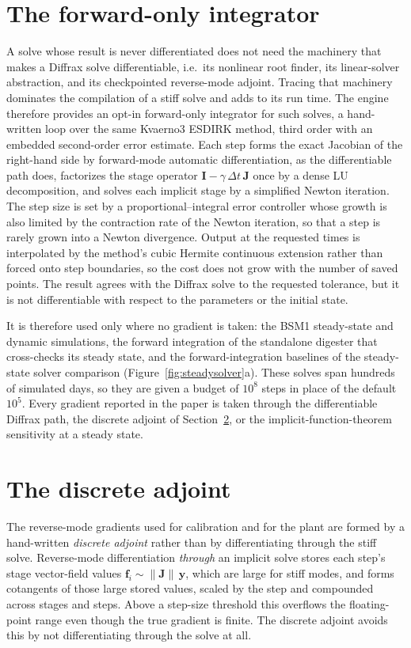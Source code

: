 \documentclass{article}
\begin{document}
\section{The forward-only integrator}
\label{si:fast-forward}
A solve whose result is never differentiated does not need the machinery that makes a Diffrax solve differentiable, i.e.\ its nonlinear root finder, its linear-solver abstraction, and its checkpointed reverse-mode adjoint. Tracing that machinery dominates the compilation of a stiff solve and adds to its run time. The engine therefore provides an opt-in forward-only integrator for such solves, a hand-written loop over the same Kvaerno3 ESDIRK method, third order with an embedded second-order error estimate. Each step forms the exact Jacobian of the right-hand side by forward-mode automatic differentiation, as the differentiable path does, factorizes the stage operator \(\mathbf{I}-\gamma\,\Delta t\,\mathbf{J}\) once by a dense LU decomposition, and solves each implicit stage by a simplified Newton iteration. The step size is set by a proportional--integral error controller whose growth is also limited by the contraction rate of the Newton iteration, so that a step is rarely grown into a Newton divergence. Output at the requested times is interpolated by the method's cubic Hermite continuous extension rather than forced onto step boundaries, so the cost does not grow with the number of saved points. The result agrees with the Diffrax solve to the requested tolerance, but it is not differentiable with respect to the parameters or the initial state.

It is therefore used only where no gradient is taken: the BSM1 steady-state and dynamic simulations, the forward integration of the standalone digester that cross-checks its steady state, and the forward-integration baselines of the steady-state solver comparison (Figure~\ref{fig:steadysolver}a). These solves span hundreds of simulated days, so they are given a budget of \(10^{8}\) steps in place of the default \(10^{5}\). Every gradient reported in the paper is taken through the differentiable Diffrax path, the discrete adjoint of Section~\ref{si:discrete-adjoint}, or the implicit-function-theorem sensitivity at a steady state.

\section{The discrete adjoint}
\label{si:discrete-adjoint}
The reverse-mode gradients used for calibration and for the plant are formed by a hand-written \emph{discrete adjoint} rather than by differentiating through the stiff solve. Reverse-mode differentiation \emph{through} an implicit solve stores each step's stage vector-field values \(\mathbf{f}_i\sim\lVert\mathbf{J}\rVert\,\mathbf{y}\), which are large for stiff modes, and forms cotangents of those large stored values, scaled by the step and compounded across stages and steps. Above a step-size threshold this overflows the floating-point range even though the true gradient is finite. The discrete adjoint avoids this by not differentiating through the solve at all.
\end{document}
